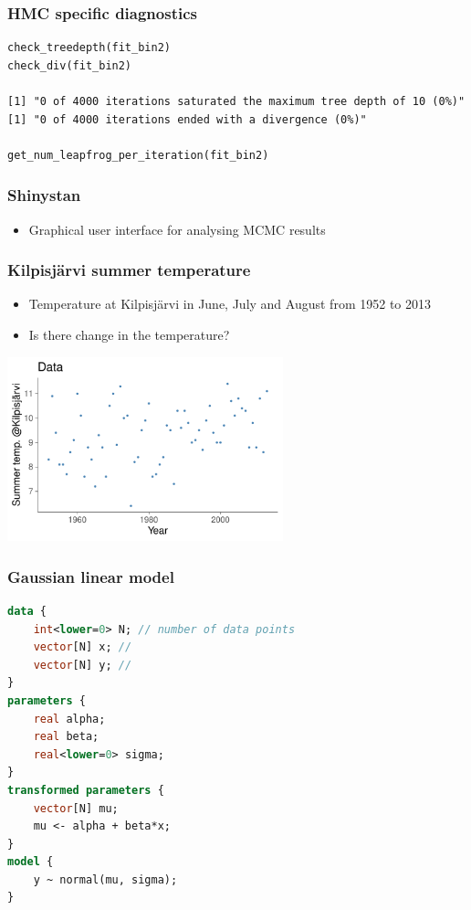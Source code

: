 \documentclass[10pt]{beamer}
\begin{document}
\begin{frame}[fragile]

\frametitle{HMC specific diagnostics}

  {\scriptsize
\begin{lstlisting}
check_treedepth(fit_bin2)
check_div(fit_bin2)

[1] "0 of 4000 iterations saturated the maximum tree depth of 10 (0%)"
[1] "0 of 4000 iterations ended with a divergence (0%)"

get_num_leapfrog_per_iteration(fit_bin2)
\end{lstlisting}
  }

\end{frame}

\begin{frame}[fragile]

\frametitle{Shinystan}

  \begin{itemize}
  \item Graphical user interface for analysing MCMC results
  \end{itemize}

\end{frame}

\begin{frame}

\frametitle{Kilpisjärvi summer temperature}

  \begin{itemize}
  \item Temperature at Kilpisjärvi in June, July and August from 1952 to 2013
  \item Is there change in the temperature?
  \end{itemize}
  \begin{center}
    \includegraphics[width=8cm]{figs/kilpis_data.pdf}
  \end{center}

\end{frame}

\begin{frame}[fragile]

\frametitle{Gaussian linear model}
  {\small
  \begin{lstlisting}[language=Stan]
data {
    int<lower=0> N; // number of data points
    vector[N] x; //
    vector[N] y; //
}
parameters {
    real alpha;
    real beta;
    real<lower=0> sigma;
}
transformed parameters {
    vector[N] mu;
    mu <- alpha + beta*x;
}
model {
    y ~ normal(mu, sigma);
}
  \end{lstlisting}
}
\end{frame}
\end{document}
